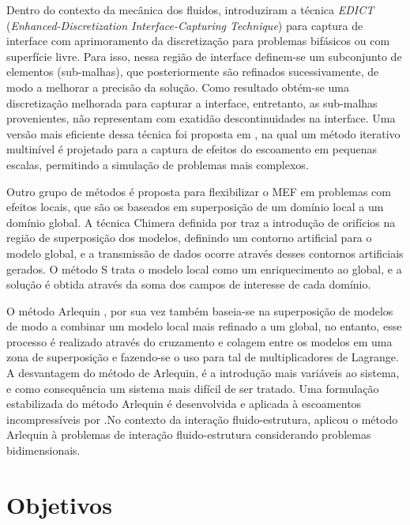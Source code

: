 \documentclass[tese_patricia.tex]{subfiles}
\begin{document}
Dentro do contexto da mecânica dos fluidos,  introduziram a técnica \textit{EDICT} (\textit{Enhanced-Discretization Interface-Capturing Technique}) para captura de interface com aprimoramento da discretização para problemas bifásicos ou com superfície livre. Para isso, nessa região de interface definem-se um subconjunto de elementos (sub-malhas), que posteriormente são refinados sucessivamente, de modo a melhorar a precisão da solução. Como resultado obtém-se uma discretização melhorada para capturar a interface, entretanto, as sub-malhas provenientes, não representam com exatidão descontinuidades na interface. Uma versão mais eficiente dessa técnica foi proposta em , na qual um método iterativo multinível é projetado para a captura de efeitos do escoamento em pequenas escalas, permitindo a simulação de problemas mais complexos.

Outro grupo de métodos é proposta para flexibilizar o MEF em problemas com efeitos locais, que são os baseados em superposição de um domínio local a um domínio global. A técnica Chimera definida por  traz a introdução de orifícios na região de superposição dos modelos, definindo um contorno artificial para o modelo global, e a transmissão de dados ocorre através desses contornos artificiais gerados. O método S \cite{Fish:1992} trata o modelo local como um enriquecimento ao global, e a solução é obtida através da soma dos campos de interesse de cada domínio.

O método Arlequin \cite{Dhia:1998,DhiaR:2001}, por sua vez também baseia-se na superposição de modelos de modo a combinar um modelo local mais refinado a um global, no entanto, esse processo é realizado através do cruzamento e colagem entre os modelos em uma zona de superposição e fazendo-se o uso para tal de multiplicadores de Lagrange. A desvantagem do método de Arlequin, é a introdução mais variáveis ao sistema, e como consequência um sistema mais difícil de ser tratado. Uma formulação estabilizada do método Arlequin é desenvolvida e aplicada à escoamentos incompressíveis por .No contexto da interação fluido-estrutura,  aplicou o método Arlequin à problemas de interação fluido-estrutura considerando problemas bidimensionais. 


\section[Objetivos]{Objetivos}
\end{document}
